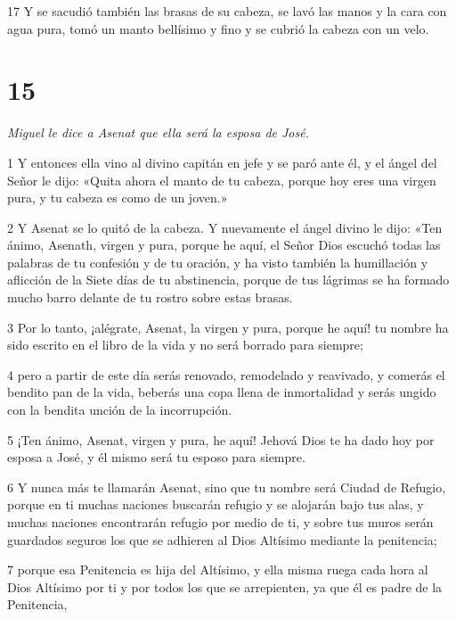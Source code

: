 \par 17 Y se sacudió también las brasas de su cabeza, se lavó las manos y la cara con agua pura, tomó un manto bellísimo y fino y se cubrió la cabeza con un velo.

\chapter{15}

\par \textit{Miguel le dice a Asenat que ella será la esposa de José.}

\par 1 Y entonces ella vino al divino capitán en jefe y se paró ante él, y el ángel del Señor le dijo: «Quita ahora el manto de tu cabeza, porque hoy eres una virgen pura, y tu cabeza es como de un joven.»

\par 2 Y Asenat se lo quitó de la cabeza. Y nuevamente el ángel divino le dijo: «Ten ánimo, Asenath, virgen y pura, porque he aquí, el Señor Dios escuchó todas las palabras de tu confesión y de tu oración, y ha visto también la humillación y aflicción de la Siete días de tu abstinencia, porque de tus lágrimas se ha formado mucho barro delante de tu rostro sobre estas brasas.

\par 3 Por lo tanto, ¡alégrate, Asenat, la virgen y pura, porque he aquí! tu nombre ha sido escrito en el libro de la vida y no será borrado para siempre;

\par 4 pero a partir de este día serás renovado, remodelado y reavivado, y comerás el bendito pan de la vida, beberás una copa llena de inmortalidad y serás ungido con la bendita unción de la incorrupción.

\par 5 ¡Ten ánimo, Asenat, virgen y pura, he aquí! Jehová Dios te ha dado hoy por esposa a José, y él mismo será tu esposo para siempre.

\par 6 Y nunca más te llamarán Asenat, sino que tu nombre será Ciudad de Refugio, porque en ti muchas naciones buscarán refugio y se alojarán bajo tus alas, y muchas naciones encontrarán refugio por medio de ti, y sobre tus muros serán guardados seguros los que se adhieren al Dios Altísimo mediante la penitencia;

\par 7 porque esa Penitencia es hija del Altísimo, y ella misma ruega cada hora al Dios Altísimo por ti y por todos los que se arrepienten, ya que él es padre de la Penitencia,


